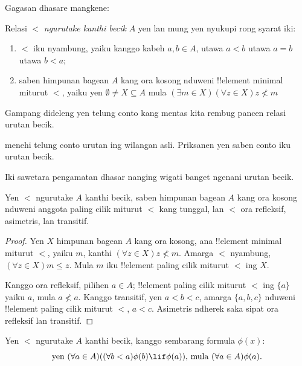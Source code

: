 \documentclass[../../../include/open-logic-section]{subfiles}
\begin{document}

Gagasan dhasare mangkene:

\begin{defn}
Relasi $<$ \emph{ngurutake kanthi becik} $A$ yen lan mung yen
nyukupi rong syarat iki:
\begin{enumerate}
	\item $<$ iku nyambung, yaiku kanggo kabeh $a, b \in A$,
	utawa $a < b$ utawa $a = b$ utawa $b < a$;
	\item saben himpunan bagean $A$ kang ora kosong nduweni
	!!{element} minimal miturut $<$, yaiku yen
	$\emptyset \neq X \subseteq A$ mula $(\exists m \in
	X)(\forall z \in X)z \nless m$
\end{enumerate}
\end{defn}

Gampang dideleng yen telung conto kang mentas kita rembug
pancen relasi urutan becik.

\begin{prob}
 menehi telung conto urutan
ing wilangan asli. Priksanen yen saben conto iku
urutan becik.
\end{prob}

Iki sawetara pengamatan dhasar nanging wigati banget
ngenani urutan becik.

\begin{prop}
Yen $<$ ngurutake $A$ kanthi becik, saben himpunan bagean
$A$ kang ora kosong nduweni anggota paling cilik miturut
$<$ kang tunggal, lan $<$ ora refleksif, asimetris, lan
transitif.
\end{prop}

\begin{proof}
Yen $X$ himpunan bagean $A$ kang ora kosong, ana !!{element}
minimal miturut $<$, yaiku $m$, kanthi
$(\forall z \in X)z \nless m$. Amarga $<$ nyambung,
$(\forall z \in X)m \leq z$. Mula $m$ iku !!{element}
paling cilik miturut $<$ ing $X$.

Kanggo ora refleksif, pilihen $a \in A$; !!{element}
paling cilik miturut $<$ ing $\{a\}$ yaiku $a$,
mula $a \nless a$. Kanggo transitif, yen $a < b < c$,
amarga $\{a, b, c\}$ nduweni !!{element} paling cilik
miturut $<$, $a < c$. Asimetris ndherek saka
sipat ora refleksif lan transitif.
\end{proof}

\begin{prop}
Yen $<$ ngurutake $A$ kanthi becik, kanggo sembarang
formula $\phi(x)$:
\[
	\text{yen }(\forall a \in A)((\forall b < a)\phi(b) \lif 
		\phi(a))\text{, mula }(\forall a \in A)\phi(a).
\]
\end{prop}
\end{document}

